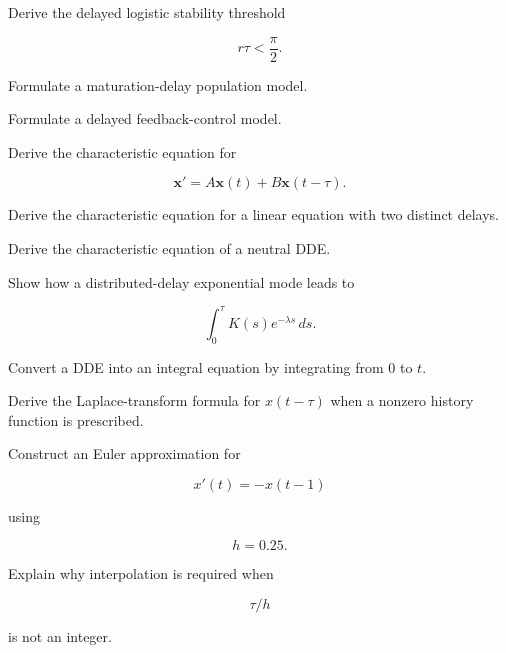 \begin{exercise}[3]
Derive the delayed logistic stability threshold

\[
r\tau<\frac{\pi}{2}.
\]
\end{exercise}

\begin{exercise}[3]
Formulate a maturation-delay population model.
\end{exercise}

\begin{exercise}[3]
Formulate a delayed feedback-control model.
\end{exercise}

\begin{exercise}[3]
Derive the characteristic equation for

\[
\mathbf{x}'
=
A\mathbf{x}(t)
+
B\mathbf{x}(t-\tau).
\]
\end{exercise}

\begin{exercise}[3]
Derive the characteristic equation for a linear equation with two
distinct delays.
\end{exercise}

\begin{exercise}[3]
Derive the characteristic equation of a neutral DDE.
\end{exercise}

\begin{exercise}[3]
Show how a distributed-delay exponential mode leads to

\[
\int_0^\tau
K(s)e^{-\lambda s}\,ds.
\]
\end{exercise}

\begin{exercise}[3]
Convert a DDE into an integral equation by integrating from \(0\) to
\(t\).
\end{exercise}

\begin{exercise}[3]
Derive the Laplace-transform formula for \(x(t-\tau)\) when a nonzero
history function is prescribed.
\end{exercise}

\begin{exercise}[3]
Construct an Euler approximation for

\[
x'(t)
=
-x(t-1)
\]

using

\[
h=0.25.
\]
\end{exercise}

\begin{exercise}[3]
Explain why interpolation is required when

\[
\tau/h
\]

is not an integer.
\end{exercise}

